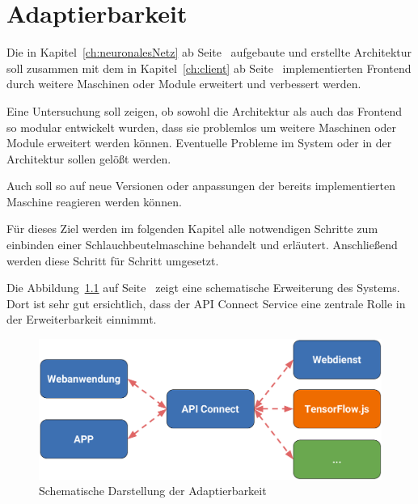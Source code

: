 \chapter{Adaptierbarkeit}
\label{ch:adaptierbarkeit}
Die in Kapitel~\ref{ch:neuronalesNetz} ab Seite~\pageref{ch:neuronalesNetz} aufgebaute und erstellte Architektur soll
zusammen mit dem in Kapitel~\ref{ch:client} ab Seite~\pageref{ch:client} implementierten Frontend durch weitere
Maschinen oder Module erweitert und verbessert werden.

Eine Untersuchung soll zeigen, ob sowohl die Architektur als auch das Frontend so modular entwickelt wurden, dass sie
problemlos um weitere Maschinen oder Module erweitert werden können. Eventuelle Probleme im System oder in der
Architektur sollen gelößt werden.

Auch soll so auf neue Versionen oder anpassungen der bereits implementierten Maschine reagieren werden können.

Für dieses Ziel werden im folgenden Kapitel alle notwendigen Schritte zum einbinden einer Schlauchbeutelmaschine
behandelt und erläutert. Anschließend werden diese Schritt für Schritt umgesetzt.

Die Abbildung~\ref{fig:schematische_architektur_5} auf Seite~\pageref{fig:schematische_architektur_5} zeigt eine
schematische Erweiterung des Systems. Dort ist sehr gut ersichtlich, dass der API Connect Service eine zentrale Rolle
in der Erweiterbarkeit einnimmt.

\begin{figure}[h]
    \centering
    \includegraphics[width=\textwidth]{images/kapitel_5/architektur_schematisch.pdf}
    \caption{Schematische Darstellung der Adaptierbarkeit}
    \label{fig:schematische_architektur_5}
\end{figure}